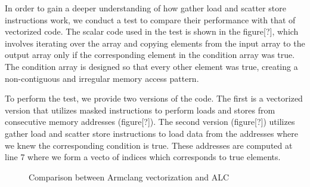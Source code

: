 \documentclass[\main/thesis.tex]{subfiles}
\begin{document}
In order to gain a deeper understanding of how gather load and scatter store instructions work, we conduct a test to compare their performance with that of vectorized code. The scalar code used in the test is shown in the figure[?], which involves iterating over the array and copying elements from the input array to the output array only if the corresponding element in the condition array was true. The condition array is designed so that every other element was true, creating a non-contiguous and irregular memory access pattern.

To perform the test, we provide two versions of the code. The first is a vectorized version that utilizes masked instructions to perform loads and stores from consecutive memory addresses (figure[?]). The second version (figure[?]) utilizes gather load and scatter store instructions to load data from the addresses where we knew the corresponding condition is true. These addresses are computed at line 7 where we form a vecto of indices which corresponds to true elements.



\begin{figure}%
    \centering
    \qquad
    \caption{Comparison between Armclang vectorization and ALC}%
    \label{fig:example}%
\end{figure}
\end{document}
